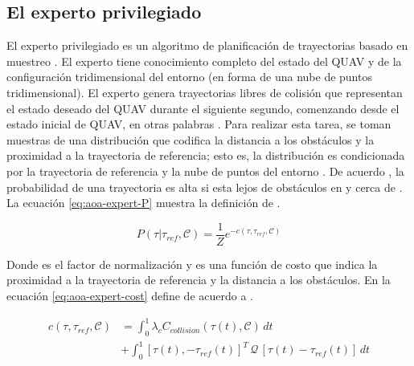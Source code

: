 \subsection{El experto privilegiado} 

El experto privilegiado es un algoritmo de planificación de trayectorias basado en muestreo \cite{Loquercio2021}. El experto tiene conocimiento completo del estado del QUAV y de la configuración tridimensional del entorno (en forma de una nube de puntos tridimensional). El experto genera trayectorias libres de colisión \jim{\tau} que representan el estado deseado del QUAV  durante el siguiente segundo, comenzando desde el estado inicial de QUAV, en otras palabras . Para realizar esta tarea, se toman muestras de una distribución  que codifica la distancia a los obstáculos y la proximidad a la trayectoria de referencia; esto es, la distribución  es condicionada por la trayectoria de referencia  y la nube de puntos del entorno . De acuerdo , la probabilidad de una trayectoria \jim{\tau} es alta si esta lejos de obstáculos en  y cerca de . La ecuación \ref{eq:aoa-expert-P} muestra la definición de  \cite{Loquercio2021}.

\begin{equation}
\label{eq:aoa-expert-P}
    P(\tau | \tau_{ref}, \mathcal{C}) = \frac{1}{Z} e^{-c(\tau, \tau_{ref}, \mathcal{C})}
\end{equation}

Donde  es el factor de normalización y  es una función de costo que indica la proximidad a la trayectoria de referencia y la distancia a los obstáculos. En la ecuación \ref{eq:aoa-expert-cost} define  de acuerdo a \cite{Loquercio2021}.

\begin{equation}
\label{eq:aoa-expert-cost}
\begin{split}
    c(\tau, \tau_{ref}, \mathcal{C}) &  = \int_{0}^{1}{\lambda_{c} C_{collision}(\tau(t), \mathcal{C}) \, dt} \\
                                     & + \int_{0}^{1}{[\tau(t), - \tau_{ref}(t)]^{T} \, \mathcal{Q} \, [\tau(t) - \tau_{ref}(t)] \, dt}
\end{split}
\end{equation}

